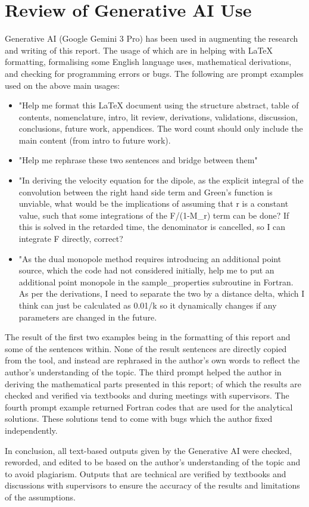 
\chapter*{Review of Generative AI Use}

Generative AI (Google Gemini 3 Pro) has been used in augmenting the research and writing of this report. The usage of which are in helping with LaTeX formatting, formalising some English language uses, mathematical derivations, and checking for programming errors or bugs. The following are prompt examples used on the above main usages:

\begin{itemize}
    \item "Help me format this LaTeX document using the structure abstract, table of contents, nomenclature, intro, lit review, derivations, validations, discussion, conclusions, future work, appendices. The word count should only include the main content (from intro to future work).
    \item "Help me rephrase these two sentences and bridge between them"
    \item "In deriving the velocity equation for the dipole, as the explicit integral of the convolution between the right hand side term and Green's function is unviable, what would be the implications of assuming that r is a constant value, such that some integrations of the F/(1-M\_r) term can be done? If this is solved in the retarded time, the denominator is cancelled, so I can integrate F directly, correct?
    \item "As the dual monopole method requires introducing an additional point source, which the code had not considered initially, help me to put an additional point monopole in the sample\_properties subroutine in Fortran. As per the derivations, I need to separate the two by a distance delta, which I think can just be calculated as 0.01/k so it dynamically changes if any parameters are changed in the future.
\end{itemize}

The result of the first two examples being in the formatting of this report and some of the sentences within. None of the result sentences are directly copied from the tool, and instead are rephrased in the author's own words to reflect the author's understanding of the topic. The third prompt helped the author in deriving the mathematical parts presented in this report; of which the results are checked and verified via textbooks and during meetings with supervisors. The fourth prompt example returned Fortran codes that are used for the analytical solutions. These solutions tend to come with bugs which the author fixed independently.

In conclusion, all text-based outputs given by the Generative AI were checked, reworded, and edited to be based on the author's understanding of the topic and to avoid plagiarism. Outputs that are technical are verified by textbooks and discussions with supervisors to ensure the accuracy of the results and limitations of the assumptions.